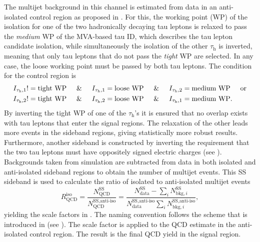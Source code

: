 The multijet background in this channel is estimated from data in an anti-isolated control region as proposed in \cite{Sirunyan:2017khh}. 
For this, the working point (WP) of the isolation for one of the two hadronically decaying tau leptons is relaxed to pass the \textit{medium} WP of the MVA-based tau ID, which describes the tau lepton candidate isolation,
while simultaneously the isolation of the other $\tau_\text{h}$ is inverted, meaning that only tau leptons that do not pass the \textit{tight} WP are selected. In any case, the loose working point must be passed by both tau leptons.
The condition for the control region is 
\begin{align}
    I_{\tau_\text{h},1} != \text{tight WP} \hspace*{0.5cm} \& \hspace*{0.5cm}  I_{\tau_\text{h},1} &= \text{loose WP}  \hspace*{0.5cm} \& \hspace*{0.5cm}  I_{\tau_\text{h},2} = \text{medium WP} \hspace*{0.5cm} \text{or} \\
    I_{\tau_\text{h},2} != \text{tight WP} \hspace*{0.5cm} \& \hspace*{0.5cm}  I_{\tau_\text{h},2} &= \text{loose WP}  \hspace*{0.5cm} \& \hspace*{0.5cm}  I_{\tau_\text{h},1} = \text{medium WP}.
\end{align}
By inverting the tight WP of one of the $\tau_\text{h}$'s it is ensured that no overlap exists with tau leptons that enter the signal regions. The relaxation of the other \tauh{} leads more events in the sideband regions, giving statistically more robust results.
Furthermore, another sideband is constructed by inverting the requirement that the two tau leptons must have oppositely signed electric charges (see ).
Backgrounds taken from simulation are subtracted from data in both isolated and anti-isolated sideband regions to obtain the number of multijet events.
This SS sideband is used to calculate the ratio of isolated to anti-isolated multijet events
\begin{equation}\label{BE:QCD:tt:eq}
    R_\text{QCD}^\text{iso} = \frac{N_\text{QCD}^\text{SS}}{N_\text{QCD}^\text{SS,anti-iso}} = \frac{N_\text{data}^\text{SS} - \sum_i N_{\text{bkg},i}^\text{SS}}{N_\text{data}^\text{SS,anti-iso} \sum_i N_{\text{bkg},i}^\text{SS,anti-iso}},
\end{equation} 
yielding the scale factors in .
The naming convention follows the scheme that is introduced in (see ). 
The scale factor is applied to the QCD estimate in the anti-isolated control region. The result is the final QCD yield in the signal region.


